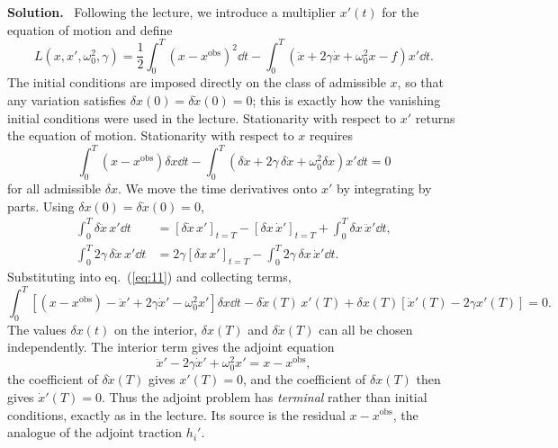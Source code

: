 \documentclass[a4paper,12pt]{paper}
\newenvironment{solution}{\par\noindent\textbf{Solution.}\ }{\par\medskip}
\begin{document}
\begin{solution}
Following the lecture, we introduce a multiplier $x'(t)$ for the equation of motion and define
\begin{equation}
L(x,x',\omega_{0}^{2},\gamma)=\frac{1}{2}\int_{0}^{T}(x-x^{\mathrm{obs}})^{2}\dd t
-\int_{0}^{T}\left(\ddot{x}+2\gamma\dot{x}+\omega_{0}^{2}x-f\right)x'\dd t.
\label{eq:10}
\end{equation}
The initial conditions are imposed directly on the class of admissible $x$, so that any variation satisfies
$\delta x(0)=\delta\dot{x}(0)=0$; this is exactly how the vanishing initial conditions were used in the lecture. Stationarity
with respect to $x'$ returns the equation of motion. Stationarity with respect to $x$ requires
\begin{equation}
\int_{0}^{T}(x-x^{\mathrm{obs}})\delta x\dd t-\int_{0}^{T}\left(\delta\ddot{x}+2\gamma\,\delta\dot{x}+\omega_{0}^{2}\delta x\right)x'\dd t=0
\label{eq:11}
\end{equation}
for all admissible $\delta x$. We move the time derivatives onto $x'$ by integrating by parts. Using $\delta x(0)=\delta\dot x(0)=0$,
\begin{align}
\int_{0}^{T}\delta\ddot{x}\,x'\dd t&=\left[\delta\dot{x}\,x'\right]_{t=T}-\left[\delta x\,\dot{x}'\right]_{t=T}+\int_{0}^{T}\delta x\,\ddot{x}'\dd t, \label{eq:12}\\
\int_{0}^{T}2\gamma\,\delta\dot{x}\,x'\dd t&=2\gamma\left[\delta x\,x'\right]_{t=T}-\int_{0}^{T}2\gamma\,\delta x\,\dot{x}'\dd t. \label{eq:13}
\end{align}
Substituting into eq.~(\ref{eq:11}) and collecting terms,
\begin{equation}
\int_{0}^{T}\left[(x-x^{\mathrm{obs}})-\ddot{x}'+2\gamma\dot{x}'-\omega_{0}^{2}x'\right]\delta x\dd t
-\delta\dot{x}(T)\,x'(T)+\delta x(T)\left[\dot{x}'(T)-2\gamma x'(T)\right]=0.
\label{eq:14}
\end{equation}
The values $\delta x(t)$ on the interior, $\delta x(T)$ and $\delta\dot{x}(T)$ can all be chosen independently. The interior
term gives the adjoint equation
\begin{equation}
\ddot{x}'-2\gamma\dot{x}'+\omega_{0}^{2}x'=x-x^{\mathrm{obs}},
\label{eq:15}
\end{equation}
the coefficient of $\delta\dot{x}(T)$ gives $x'(T)=0$, and the coefficient of $\delta x(T)$ then gives $\dot{x}'(T)=0$. Thus the
adjoint problem has \emph{terminal} rather than initial conditions, exactly as in the lecture. Its source is the residual
$x-x^{\mathrm{obs}}$, the analogue of the adjoint traction $h_{i}'$.


\end{solution}
\end{document}

